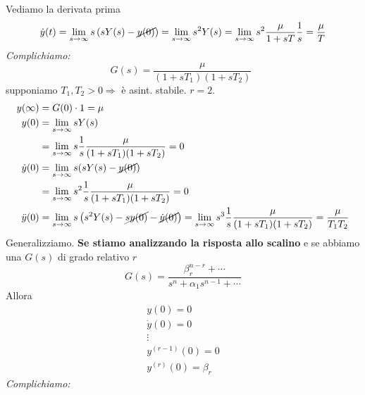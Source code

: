 \documentclass[10pt,a4paper]{book}
\begin{document}
Vediamo la derivata prima
\begin{equation*}
	\dot{y}(t) =\lim _{s\rightarrow \infty } s\left(sY(s) -\cancel{y(0)}\right) =\lim _{s\rightarrow \infty } s^2 Y(s) =\lim _{s\rightarrow \infty } s^2\frac{\mu }{1+sT}\frac{1}{s} =\frac{\mu }{T}
\end{equation*}
\textit{Complichiamo:}
\begin{equation*}
	G(s)=\frac{\mu }{(1+sT_1)(1+sT_2)} \ \ 
\end{equation*}
supponiamo $T_1 ,T_2  >0\Rightarrow $ è asint. stabile. $r=2$.
\begin{equation*}
	\begin{aligned}
		y(\infty)    & =G(0)\cdot 1=\mu                                                                                                                                                                          \\
		y(0)         & =\lim _{s\rightarrow \infty } sY(s)                                                                                                                                                       \\
		             & =\lim _{s\rightarrow \infty } s\frac{1}{s}\frac{\mu }{(1+sT_1)(1+sT_2)} =0                                                                                                                \\
		\dot{y} (0)  & =\lim _{s\rightarrow \infty } s(sY(s)-\cancel{y(0)})                                                                                                                                      \\
		             & =\lim _{s\rightarrow \infty } s^2\frac{1}{s}\frac{\mu }{(1+sT_1)(1+sT_2)} =0                                                                                                              \\
		\ddot{y} (0) & =\lim _{s\rightarrow \infty } s\left(s^2 Y(s)-\cancel{sy(0)} -\cancel{\dot{y} (0)}\right) =\lim _{s\rightarrow \infty } s^3\frac{1}{s}\frac{\mu }{(1+sT_1)(1+sT_2)} =\frac{\mu }{T_1 T_2} 
	\end{aligned}
\end{equation*}
Generalizziamo. \textbf{Se stiamo analizzando la risposta allo scalino} e se abbiamo una $G(s)$ di grado relativo $r$
\begin{equation*}
	G(s) =\frac{\beta ^{n-r}_r +\cdots }{s^n +\alpha _1 s^{n-1} +\cdots }
\end{equation*}
Allora
\begin{equation*}
	\boxed{
		\begin{array}{ c }
			y(0) =0              \\
			\dot{y}(0) =0        \\
			\vdots               \\
			y^{(r-1)}(0) =0      \\
			y^{(r)}(0) =\beta _r 
		\end{array}
	}
\end{equation*}
\textit{Complichiamo:}
\end{document}
